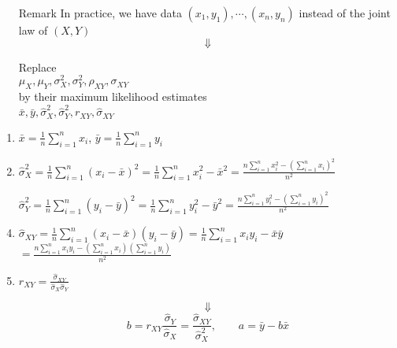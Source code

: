 \begin{frame}[fragile]

\begin{enumerate}
\item[Remark] In practice, we have data $(x_1,y_1),\cdots,(x_n,y_n)$ instead of the joint law of $(X,Y)$ \\
\[\Downarrow\]
\begin{center}
Replace\\[1em]
$\mu_X, \mu_Y, \sigma_X^2,\sigma_Y^2,\rho_{XY}, \sigma_{XY}$
\\[1em]
by their maximum likelihood estimates\\[1em]
$\bar{x},\bar{y},\hat{\sigma}_X^2,\hat{\sigma}_Y^2,r_{XY},\hat{\sigma}_{XY}$
\end{center}
\end{enumerate}
\end{frame}
\begin{frame}
\begin{enumerate}
\item $\bar x = \frac{1}{n}\sum_{i=1}^n x_i$, $\bar y = \frac{1}{n}\sum_{i=1}^n y_i$\\[2em]
\item $\displaystyle \hat{\sigma}_X^2 =  \frac{1}{n}\sum_{i=1}^n \left(x_i-\bar x \right)^2= \frac{1}{n}\sum_{i=1}^n x_i^2 -\bar x^2=  \frac{n\sum_{i=1}^n x_i^2 - \left(\sum_{i=1}^n x_i \right)^2}{n^2}$
\item[]  $\displaystyle \hat{\sigma}_Y^2 =  \frac{1}{n}\sum_{i=1}^n \left(y_i-\bar y \right)^2= \frac{1}{n}\sum_{i=1}^n y_i^2 -\bar y^2=  \frac{n\sum_{i=1}^n y_i^2 - \left(\sum_{i=1}^n y_i \right)^2}{n^2}$ \\[2em]
\item $\displaystyle \hat{\sigma}_{XY}= \frac{1}{n}\sum_{i=1}^n \left(x_i-\bar x \right)\left(y_i-\bar y \right)=
	\frac{1}{n}\sum_{i=1}^n x_iy_i - \bar{x}\bar{y} $\\[0.5em]
	\hspace{2em}$\displaystyle =  \frac{n\sum_{i=1}^n x_iy_i -
		\left(\sum_{i=1}^n x_i \right)
		\left(\sum_{i=1}^n y_i \right)
	}{n^2}$\\[2em]
\item $\displaystyle r_{XY} =  \frac{\hat{\sigma}_{XY}}{\hat{\sigma}_X \hat{\sigma}_Y}$
\item[]
	\[
	\Downarrow
	\]
	\[
		\boxed{b = r_{XY} \frac{\hat{\sigma}_Y}{\hat{\sigma}_X} = \frac{\hat{\sigma}_{XY}}{\hat{\sigma}_X^2},
		\qquad a = \bar{y}-b\bar{x}}
	\]
\end{enumerate}
\end{frame}
